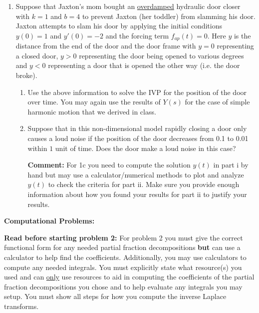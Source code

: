 \documentclass[11pt,a4paper]{article}
\begin{document}
\begin{enumerate}
\begin{enumerate}
			
			\item Suppose that Jaxton's mom bought an \underline{overdamped} hydraulic door closer with $k=1$ and $b=4$ to prevent Jaxton (her toddler) from slamming his door. Jaxton attempts to slam his door by applying the initial conditions $y(0)=1$ and $y'(0)=-2$ and the forcing term $f_{ap}(t)=0$. Here $y$ is the distance from the end of the door and the door frame with $y=0$ representing a closed door, $y>0$ representing the door being opened to various degrees and $y<0$ representing a door that is opened the other way (i.e. the door broke).
			\begin{enumerate}
				\item Use the above information to solve the IVP for the position of the door over time. You may again use the results of $Y(s)$ for the case of simple harmonic motion that we derived in class.
				
				\item Suppose that in this non-dimensional model rapidly closing a door only causes a loud noise if the position of the door decreases from 0.1 to 0.01 within $1$ unit of time. Does the door make a loud noise in this case?
				
				
				\textbf{Comment:} For 1c you need to compute the solution $y(t)$ in part i by hand but may use a calculator/numerical methods to plot and analyze $y(t)$ to check the criteria for part ii. Make sure you provide enough information about how you found your results for part ii to justify your results. 
			\end{enumerate}
			
			
			
			
			
		\end{enumerate}
		
		
		
		
		
		
		
	\begin{center}
		\textbf{Computational Problems:}
	\end{center}
		
		
		\textbf{Read before starting problem 2:} For problem 2 you must give the correct functional form for any needed partial fraction decompositions \textbf{but} can use a calculator to help find the coefficients. Additionally, you may use calculators to compute any needed integrals. You must explicitly state what resource(s) you used and can \underline{only} use resources to aid in computing the coefficients of the partial fraction decompositions you chose and to help evaluate any integrals you may setup. You must show all steps for how you compute the inverse Laplace transforms.
		

\end{enumerate}
\end{document}
